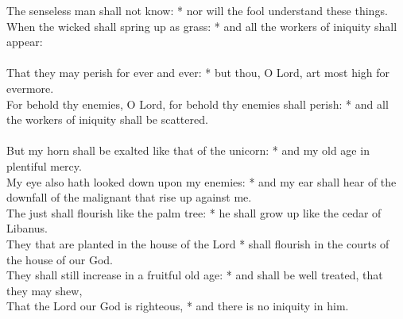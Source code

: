 \begin{Parallel}[v]{\colw}{\colx}
{{The senseless man shall not know: * nor will the fool understand these things.\\
When the wicked shall spring up as grass: * and all the workers of iniquity shall appear:\\ \\
That they may perish for ever and ever: * but thou, O Lord, art most high for evermore.\\
For behold thy enemies, O Lord, for behold thy enemies shall perish: * and all the workers of iniquity shall be scattered.\\ \\
But my horn shall be exalted like that of the unicorn: * and my old age in plentiful mercy.\\
My eye also hath looked down upon my enemies: * and my ear shall hear of the downfall of the malignant that rise up against me.\\
The just shall flourish like the palm tree: * he shall grow up like the cedar of Libanus.\\
They that are planted in the house of the Lord * shall flourish in the courts of the house of our God.\\
They shall still increase in a fruitful old age: * and shall be well treated, that they may shew,\\
That the Lord our God is righteous, * and there is no iniquity in him.}}

\end{Parallel}



